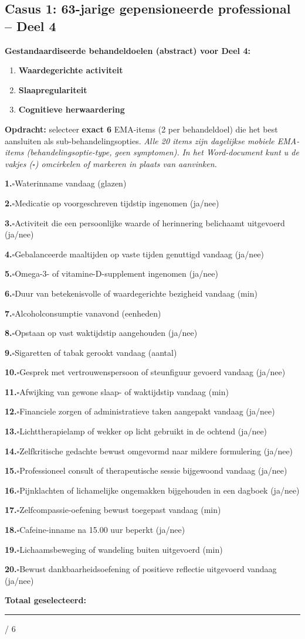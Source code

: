 \documentclass[11pt,a4paper]{article}
\newcommand{\checkitemBFS}[2]{%
\noindent\small\textbf{#1.}\hspace{0.45em}$\square$\hspace{0.4em}#2\par\vspace{0.20em}}
\begin{document}
\newpage
\subsection*{Casus 1: 63-jarige gepensioneerde professional -- Deel 4}

\begin{contextbox}
\small\textbf{Gestandaardiseerde behandeldoelen (abstract) voor Deel 4:}
\begin{enumerate}[topsep=2pt,itemsep=1pt,label=\arabic*.]
\item \textbf{Waardegerichte activiteit}
\item \textbf{Slaapregulariteit}
\item \textbf{Cognitieve herwaardering}
\end{enumerate}
\end{contextbox}

\begin{responsebox}[title={Uw antwoord -- Deel 4}]
\small\textbf{Opdracht:} selecteer \textbf{exact 6} EMA-items (2 per behandeldoel) die het best aansluiten als sub-behandelingsopties.
\textit{Alle 20 items zijn dagelijkse mobiele EMA-items (behandelingsoptie-type, geen symptomen).}
\textit{In het Word-document kunt u de vakjes ($\square$) omcirkelen of markeren in plaats van aanvinken.}

\checkitemBFS{1}{Waterinname vandaag (glazen)}
\checkitemBFS{2}{Medicatie op voorgeschreven tijdstip ingenomen (ja/nee)}
\checkitemBFS{3}{Activiteit die een persoonlijke waarde of herinnering belichaamt uitgevoerd (ja/nee)}
\checkitemBFS{4}{Gebalanceerde maaltijden op vaste tijden genuttigd vandaag (ja/nee)}
\checkitemBFS{5}{Omega-3- of vitamine-D-supplement ingenomen (ja/nee)}
\checkitemBFS{6}{Duur van betekenisvolle of waardegerichte bezigheid vandaag (min)}
\checkitemBFS{7}{Alcoholconsumptie vanavond (eenheden)}
\checkitemBFS{8}{Opstaan op vast waktijdstip aangehouden (ja/nee)}
\checkitemBFS{9}{Sigaretten of tabak gerookt vandaag (aantal)}
\checkitemBFS{10}{Gesprek met vertrouwenspersoon of steunfiguur gevoerd vandaag (ja/nee)}
\checkitemBFS{11}{Afwijking van gewone slaap- of waktijdstip vandaag (min)}
\checkitemBFS{12}{Financiele zorgen of administratieve taken aangepakt vandaag (ja/nee)}
\checkitemBFS{13}{Lichttherapielamp of wekker op licht gebruikt in de ochtend (ja/nee)}
\checkitemBFS{14}{Zelfkritische gedachte bewust omgevormd naar mildere formulering (ja/nee)}
\checkitemBFS{15}{Professioneel consult of therapeutische sessie bijgewoond vandaag (ja/nee)}
\checkitemBFS{16}{Pijnklachten of lichamelijke ongemakken bijgehouden in een dagboek (ja/nee)}
\checkitemBFS{17}{Zelfcompassie-oefening bewust toegepast vandaag (min)}
\checkitemBFS{18}{Cafeine-inname na 15.00 uur beperkt (ja/nee)}
\checkitemBFS{19}{Lichaamsbeweging of wandeling buiten uitgevoerd (min)}
\checkitemBFS{20}{Bewust dankbaarheidsoefening of positieve reflectie uitgevoerd vandaag (ja/nee)}
\vspace{0.4em}
\noindent\textbf{Totaal geselecteerd:}\hspace{0.5em}\rule{1.2cm}{0.25pt}\hspace{0.2em}/ 6
\end{responsebox}
\end{document}
